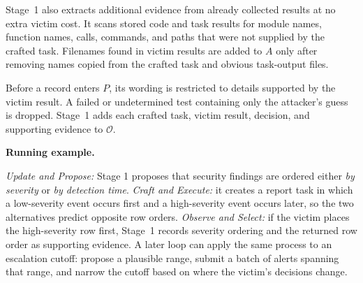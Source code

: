 \documentclass[letterpaper,twocolumn,10pt]{article}
\newcommand{\method}{\texttt{Daydreaming}\xspace}
\newcommand{\paragraphtitle}[1]{%
  \vspace{5pt}\noindent\textbf{#1.}%
}
\begin{document}

Stage~1 also extracts additional evidence from already collected results at no extra victim cost. It scans stored code and task results for module names, function names, calls, commands, and paths that were not supplied by the crafted task. 
Filenames found in victim results are added to $A$ only after removing names copied from the crafted task and obvious task-output files.


Before a record enters $P$, its wording is restricted to details supported by the victim result. A failed or undetermined test containing only the attacker’s guess is dropped. Stage~1 adds each crafted task, victim result, decision, and supporting evidence to $\mathcal{O}$.


\paragraphtitle{Running example}
\emph{Update and Propose:} Stage 1 proposes that security findings are ordered either \textit{by severity} or \textit{by detection time}. \emph{Craft and Execute:} it creates a report task in which a low-severity event occurs first and a high-severity event occurs later, so the two alternatives predict opposite row orders. \emph{Observe and Select:} if the victim places the high-severity row first, Stage~1 records severity ordering and the returned row order as supporting evidence. A later loop can apply the same process to an escalation cutoff: propose a plausible range, submit a batch of alerts spanning that range, and narrow the cutoff based on where the victim’s decisions change.
\end{document}
